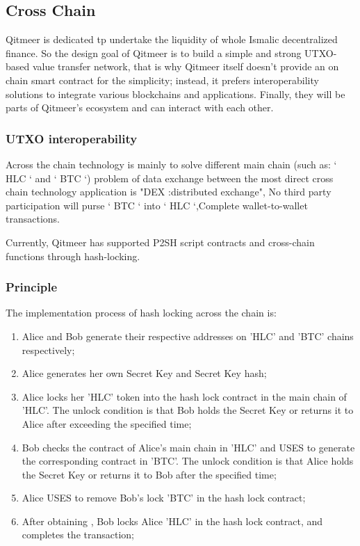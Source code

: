 \documentclass[a4paper,11pt]{article}
\begin{document}
\subsection{Cross Chain}
Qitmeer is dedicated tp undertake the liquidity of whole Ismalic decentralized finance. So the design goal of Qitmeer is to build a simple and strong UTXO-based value transfer network, that is why Qitmeer itself doesn't provide an on chain smart contract for the simplicity; instead, it prefers interoperability solutions to integrate various blockchains and applications. Finally, they will be parts of Qitmeer's ecosystem and can interact with each other. 

\subsubsection{UTXO interoperability}

Across the chain technology is mainly to solve different main chain (such as: ` HLC ` and ` BTC `) problem of data exchange between the most direct cross chain technology application is "DEX :distributed exchange", No third party participation will purse ` BTC ` into ` HLC `,Complete wallet-to-wallet transactions.

Currently, Qitmeer has supported P2SH script contracts and cross-chain functions through hash-locking.

\subsubsection*{Principle}

The implementation process of hash locking across the chain is:

\begin{enumerate}
\item  Alice and Bob generate their respective addresses on 'HLC' and 'BTC' chains respectively;

\item Alice generates her own Secret Key and Secret Key hash;

\item Alice locks her 'HLC' token into the hash lock contract in the main chain of 'HLC'. The unlock condition is that Bob holds the Secret Key or returns it to Alice after exceeding the specified time;

\item Bob checks the contract of Alice's main chain in 'HLC' and USES to generate the corresponding contract in 'BTC'. The unlock condition is that Alice holds the Secret Key or returns it to Bob after the specified time;

\item Alice USES to remove Bob's lock 'BTC' in the hash lock contract;

\item After obtaining , Bob locks Alice 'HLC' in the hash lock contract, and completes the transaction;
	
\end{enumerate}
\end{document}
